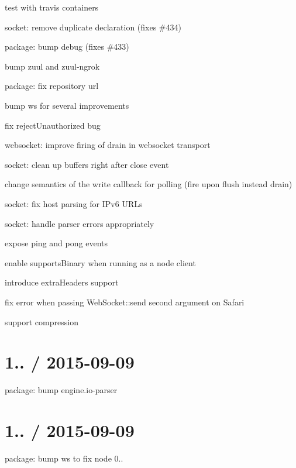 \begin{DoxyItemize}
\item test with travis containers
\item socket\+: remove duplicate declaration (fixes \#434)
\item package\+: bump {\ttfamily debug} (fixes \#433)
\item bump zuul and zuul-\/ngrok
\item package\+: fix repository url
\item bump {\ttfamily ws} for several improvements
\item fix reject\+Unauthorized bug
\item websocket\+: improve firing of {\ttfamily drain} in websocket transport
\item socket\+: clean up buffers right after {\ttfamily close} event
\item change semantics of the write callback for polling (fire upon flush instead drain)
\item socket\+: fix host parsing for I\+Pv6 U\+R\+Ls
\item socket\+: handle parser errors appropriately
\item expose {\ttfamily ping} and {\ttfamily pong} events
\item enable {\ttfamily supports\+Binary} when running as a node client
\item introduce {\ttfamily extra\+Headers} support
\item fix error when passing {\ttfamily Web\+Socket\+::send} second argument on Safari
\item support compression
\end{DoxyItemize}

\section*{1.. / 2015-\/09-\/09 }


\begin{DoxyItemize}
\item package\+: bump {\ttfamily engine.\+io-\/parser}
\end{DoxyItemize}

\section*{1.. / 2015-\/09-\/09 }


\begin{DoxyItemize}
\item package\+: bump {\ttfamily ws} to fix node 0..
\end{DoxyItemize}

